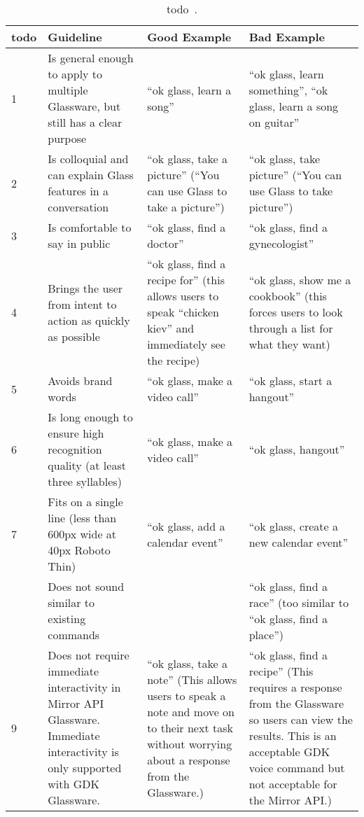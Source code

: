 	\begin{table}[ht!]
    		\caption{todo~\cite{glassVoiceChecklist}.} \label{tab:voiceCommandCheckTableUnchecked}
		\centering \begin{tabularx}{\textwidth}{l|X|X|X} \hline
		\textbf{todo} & \textbf{Guideline} & \textbf{Good Example} & \textbf{Bad Example} \\ \hline \hline
       
1	&	Is general enough to apply to multiple Glassware, but still has a clear purpose	&	``ok glass, learn a song''	&	``ok glass, learn something'', ``ok glass, learn a song on guitar''	\\ \hline
2	&	Is colloquial and can explain Glass features in a conversation	&	``ok glass, take a picture'' (``You can use Glass to take a picture'')	&	``ok glass, take picture'' (``You can use Glass to take picture'')	\\ \hline
3	&	Is comfortable to say in public	&	``ok glass, find a doctor''	&	``ok glass, find a gynecologist''	\\ \hline
4	&	Brings the user from intent to action as quickly as possible	&	``ok glass, find a recipe for'' (this allows users to speak ``chicken kiev'' and immediately see the recipe)	&	``ok glass, show me a cookbook'' (this forces users to look through a list for what they want)	\\ \hline
5	&	Avoids brand words	&	``ok glass, make a video call''	&	``ok glass, start a hangout''	\\ \hline
6	&	Is long enough to ensure high recognition quality (at least three syllables)	&	``ok glass, make a video call''	&	``ok glass, hangout''	\\ \hline
7	&	Fits on a single line (less than 600px wide at 40px Roboto Thin)	&	``ok glass, add a calendar event''	&	``ok glass, create a new calendar event''	\\ \hline \pagebreak
8	&	Does not sound similar to existing commands	&		&	``ok glass, find a race'' (too similar to ``ok glass, find a place'')	\\ \hline
9	&	Does not require immediate interactivity in Mirror API Glassware. Immediate interactivity is only supported with GDK Glassware.	&	``ok glass, take a note'' (This allows users to speak a note and move on to their next task without worrying about a response from the Glassware.)	&	``ok glass, find a recipe'' (This requires a response from the Glassware so users can view the results. This is an acceptable GDK voice command but not acceptable for the Mirror API.)	\\ \hline

\end{tabularx}
\end{table}
